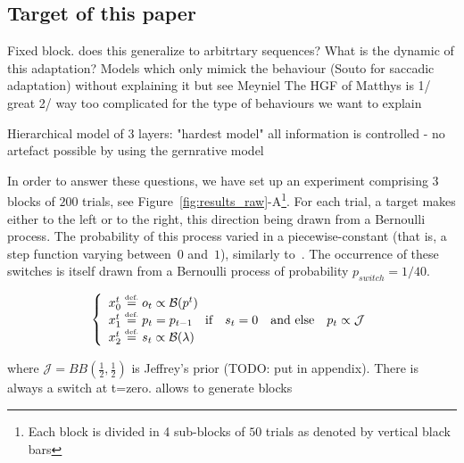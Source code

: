 \documentclass[profile,final,english, draft]{article}%
\newcommand{\choice}[1]{ %
	\left\{ %
		\begin{array}{l} #1 \end{array} %
	\right. }
\newcommand{\eqdef}{\ensuremath{\stackrel{\mbox{\upshape\tiny def.}}{=}}}
\newcommand{\eql}[1]{\begin{equation}#1\end{equation}}
\newcommand{\Bb}{\mathcal{B}}
\newcommand{\Jj}{\mathcal{J}}
\begin{document}
\subsection{Target of this paper}
Fixed block. does this generalize to arbitrtary sequences? What is the dynamic of this adaptation?
Models which only mimick the behaviour (Souto for saccadic adaptation) without explaining it but see Meyniel
The HGF of Matthys is 1/ great 2/ way too complicated for the type of behaviours we want to explain

Hierarchical model of 3 layers: "hardest model" all information is controlled - no artefact possible by using the gernrative model

In order to answer these questions, we have set up an experiment comprising $3$ blocks of $200$ trials, see Figure~\ref{fig:results_raw}-A\footnote{Each block is divided in 4 sub-blocks of $50$ trials as denoted by vertical black bars}. For each trial, a target makes either to the left or to the right, this direction being drawn from a Bernoulli process. The probability of this process varied in a piecewise-constant (that is, a step function varying between~$0$ and~$1$), similarly to~\textcite{Meyniel13}. The occurrence of these switches is itself drawn from a Bernoulli process of probability $p_{switch}=1/40$.

\eql{\choice{
x_0^t \eqdef o_t \propto \Bb(p^t) \\
x_1^t \eqdef p_t = p_{t-1} \quad \text{if} \quad s_t=0 \quad \text{and else} \quad p_t \propto \Jj \\
x_2^t \eqdef s_t \propto \Bb(\lambda) 
}}

where $\Jj = BB(\frac 1 2 , \frac 1 2 )$ is Jeffrey's prior (TODO: put in appendix). There is always a switch at t=zero.
allows to generate blocks

%
%
% 
\end{document}
